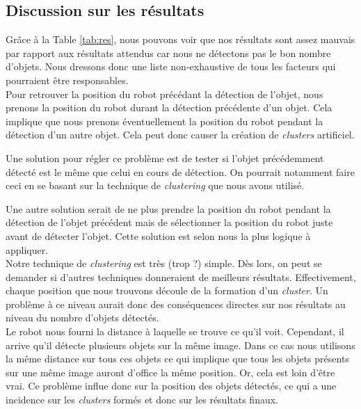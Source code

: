 \documentclass[10pt,a4paper]{article}
\begin{document}
   		\subsection{Discussion sur les résultats}
   		
   		Grâce à la Table \ref{tab:res}, nous pouvons voir que nos résultats sont assez mauvais par rapport aux résultats attendus car nous ne détectons pas le bon nombre d'objets. Nous dressons donc une liste non-exhaustive de tous les facteurs qui pourraient être responsables.\\
   		

		Pour retrouver la position du robot précédant la détection de l'objet, nous prenons la position du robot durant la détection précédente d'un objet. Cela implique que nous prenons éventuellement la position du robot pendant la détection d'un autre objet. Cela peut donc causer la création de \textit{clusters} artificiel.
		
		Une solution pour régler ce problème est de tester si l'objet précédemment détecté est le même que celui en cours de détection. On pourrait notamment faire ceci en se basant sur la technique de \textit{clustering} que nous avons utilisé.
		
		Une autre solution serait de ne plus prendre la position du robot pendant la détection de l'objet précédent mais de sélectionner la position du robot juste avant de détecter l'objet. Cette solution est selon nous la plus logique à appliquer.\\

		Notre technique de \textit{clustering} est très (trop ?) simple. Dès lors, on peut se demander si d'autres techniques donneraient de meilleurs résultats. Effectivement, chaque position que nous trouvons découle de la formation d'un \textit{cluster}. Un problème à ce niveau aurait donc des conséquences directes sur nos résultats au niveau du nombre d'objets détectés.\\

   		Le robot nous fourni la distance à laquelle se trouve ce qu'il voit. Cependant, il arrive qu'il détecte plusieurs objets sur la même image. Dans ce cas nous utilisons la même distance sur tous ces objets ce qui implique que tous les objets présents sur une même image auront d'office la même position. Or, cela est loin d'être vrai. Ce problème influe donc sur la position des objets détectés, ce qui a une incidence sur les \textit{clusters} formés et donc sur les résultats finaux.
   
          	
\end{document}
